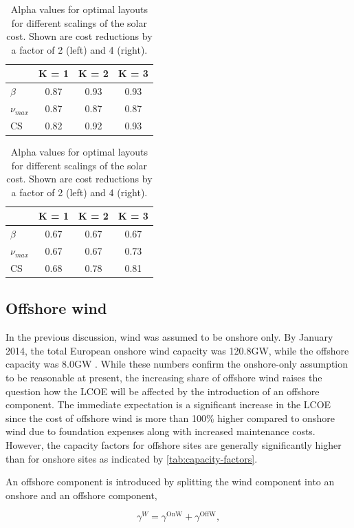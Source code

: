 \documentclass[a4paper, 12pt, sort&compress]{elsarticle}%
\begin{document}
\begin{table}[h!]
  \centering
  \caption{Alpha values for optimal layouts for different scalings of
    the solar cost. Shown are cost reductions by a factor of 2 (left)
    and 4 (right).}
  \label{tab:solar-alpha}
  \begin{tabular}[h!]{l c c c}\toprule
    & K = 1 & K = 2 & K = 3 \\ \midrule
    $\beta$ & 0.87 & 0.93 & 0.93 \\ 
    $\nu_{max}$ & 0.87 & 0.87 & 0.87 \\ 
    CS & 0.82 & 0.92 & 0.93 \\ \bottomrule
  \end{tabular}
  \hspace{30pt}
  \begin{tabular}[h!]{l c c c}\toprule
    & K = 1 & K = 2 & K = 3 \\ \midrule
    $\beta$ & 0.67 & 0.67 & 0.67 \\ 
    $\nu_{max}$ & 0.67 & 0.67 & 0.73 \\ 
    CS & 0.68 & 0.78 & 0.81 \\ \bottomrule

  \end{tabular}
\end{table}

\subsection{Offshore wind}
\label{sec:offshore-wind}

In the previous discussion, wind was assumed to be onshore only. By
January 2014, the total European onshore wind capacity was 120.8GW,
while the offshore capacity was 8.0GW \cite{EWEA}. While these numbers
confirm the onshore-only assumption to be reasonable at present, the
increasing share of offshore wind raises the question how the LCOE
will be affected by the introduction of an offshore component. The
immediate expectation is a significant increase in the LCOE since the
cost of offshore wind is more than 100\% higher compared to onshore
wind due to foundation expenses along with increased maintenance
costs. However, the capacity factors for offshore sites are generally
significantly higher than for onshore sites as indicated by
\cref{tab:capacity-factors}.

An offshore component is introduced by splitting the wind component
into an onshore and an offshore component,

\begin{equation}
  \label{eq:11}
  \gamma^{W} = \gamma^{\text{OnW}} + \gamma^{\text{OffW}}, 
\end{equation}
\end{document}
